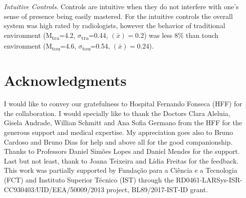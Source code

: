 \documentclass{chi-ext}
\begin{document}
\clearpage
 
\textit{Intuitive Controls}. Controls are intuitive when they do not interfere with one's sense of presence being easily mastered. For the intuitive controls the overall system was high rated by radiologists, however the behavior of traditional environment (M\textsubscript{tra}=4.2, $\sigma$\textsubscript{tra}=0.44, {}$\left({\bar x}\right)=0.2$) was less 8\% than touch environment (M\textsubscript{tou}=4.6, $\sigma$\textsubscript{tou}=0.54, {}$\left({\bar x}\right)=0.24$).

\section{Acknowledgments}

I would like to convey our gratefulness to Hospital Fernando Fonseca (HFF) for the collaboration. I would specially like to thank the Doctors Clara Aleluia, Gisela Andrade, Willian Schmitt and Ana Sofia Germano from the HFF for the generous support and medical expertise. My appreciation goes also to Bruno Cardoso and Bruno Dias for help and above all for the good companionship. Thanks to Professors Daniel Sim\~{o}es Lopes and Daniel Mendes for the support. Last but not least, thank to Joana Teixeira and L\'{i}dia Freitas for the feedback. This work was partially supported by Funda\c{c}\~{a}o para a Ci\^{e}ncia e a Tecnologia (FCT) and Instituto Superior T\'{e}cnico (IST) through the RD0461-LARSys-ISR-CC930403:UID/EEA/50009/2013 project, BL89/2017-IST-ID grant.

\balance


\end{document}
